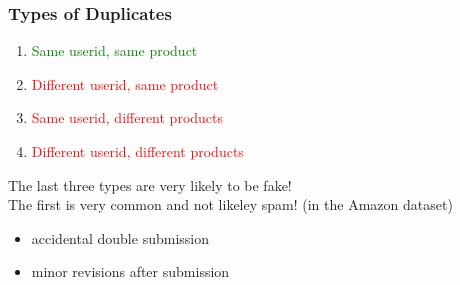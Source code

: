 \documentclass[t]{beamer}
\begin{document}
\begin{frame} \frametitle{Types of Duplicates} %

\begin{enumerate}
\item \textcolor{green}{Same userid, same product }
\item \textcolor{red}{Different userid, same product }
\item \textcolor{red}{Same userid, different products }
\item \textcolor{red}{Different userid, different products }
\end{enumerate}

The last three types are very likely to be fake! \\
The first is very common and not likeley spam! (in the Amazon dataset)
\begin{itemize}
  \item accidental double submission
  \item minor revisions after submission
\end{itemize}

\end{frame}
\end{document}
